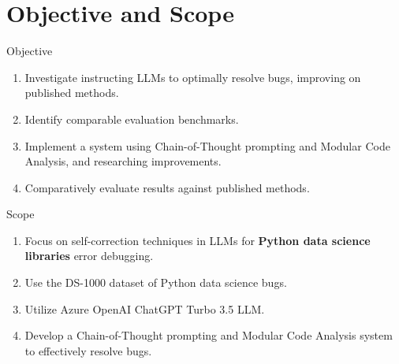 \section{Objective and Scope}

\begin{frame}{Objective}
    \begin{enumerate}
        \item Investigate instructing LLMs to optimally resolve bugs, improving on published methods.

        \item Identify comparable evaluation benchmarks.

        \item Implement a system using Chain-of-Thought prompting and Modular Code Analysis, and researching improvements.

        \item Comparatively evaluate results against published methods.
    \end{enumerate}
\end{frame}

\begin{frame}{Scope}
    \begin{enumerate}
        \item Focus on self-correction techniques in LLMs for \textbf{Python data science libraries} error debugging.

        \item Use the DS-1000 dataset of Python data science bugs.

        \item Utilize Azure OpenAI ChatGPT Turbo 3.5 LLM.

        \item Develop a Chain-of-Thought prompting and Modular Code Analysis system to effectively resolve bugs.
    \end{enumerate}
\end{frame}
